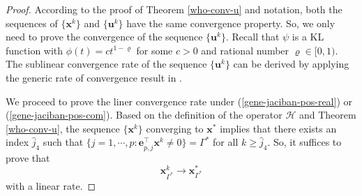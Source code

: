 \documentclass{article}
\numberwithin{equation}{section}
\begin{document}
\begin{proof}
According to the proof of Theorem \ref{who-conv-u} and notation, both the sequences of $\{\mathbf{x}^k\}$ and $\{\mathbf{u}^k\}$ have the same convergence property. So, we only need to prove the convergence of the sequence $\{\mathbf{u}^k\}$. Recall that $\psi$ is a KL function with $\phi(t)=ct^{1-\varrho}$ for some $c>0$ and rational number $\varrho\in[0,1).$ The sublinear convergence rate of the sequence $\{\mathbf{u}^k\}$ can be derived by applying the generic rate of convergence result in \cite{attouch2009convergence}.

We proceed to prove the liner convergence rate under (\ref{gene-jaciban-pos-real}) or (\ref{gene-jaciban-pos-com}).
Based on the definition of the operator $\mathcal{H}$ and Theorem \ref{who-conv-u}, the sequence $\{\mathbf{x}^k\}$ converging to $\mathbf{x}^*$ implies that there exists an index $\hat{j}_4$ such that $\{j=1,\cdots,p: \mathbf{e}_{p,j}^\top\mathbf{x}^k\neq0\}=\Gamma^*$ for all $k\geq\hat{j}_4$.
So, it suffices to prove that \begin{equation}\label{x_subvector}\mathbf{x}_{\Gamma^*}^k\to\mathbf{x}_{\Gamma^*}^*\end{equation} with a linear rate.



\end{proof}
\end{document}
